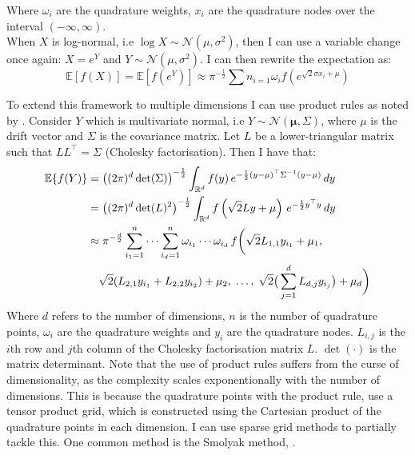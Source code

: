 \documentclass[11pt]{article}
\begin{document}
Where $\omega_i$ are the quadrature weights, $x_i$ are the quadrature nodes over the interval $(-\infty , \infty)$.\\
When $X$ is log-normal, i.e $\log X \sim \mathcal{N}(\mu , \sigma^{2})$, then I can use a variable change once again:
$X = e^{Y}$ and $Y \sim \mathcal{N}(\mu , \sigma^{2})$. I can then rewrite the expectation as:
\begin{equation}
  \mathbb{E} [ f(X) ] = \mathbb{E} [ f(e^{Y}) ] \approx \pi^{-\frac{1}{2}} \sum{n}_{i=1} \omega_i f \left( e^{ \sqrt{2} \sigma x_{i} + \mu } \right)
\end{equation}

To extend this framework to multiple dimensions I can use product rules as noted by \autocite{Judd1998Book}.
Consider $Y$ which is multivariate normal, i.e $Y \sim \mathcal{N}(\boldsymbol{\mu} , \Sigma)$,
where $\mu$ is the drift vector and $\Sigma$ is the covariance matrix.
Let $L$ be a lower-triangular matrix such that $LL^{\top} = \Sigma$ (Cholesky factorisation).
Then I have that:
\begin{align}
  \mathbb{E}\{f(Y)\} & = \left( (2\pi)^d \det(\Sigma) \right)^{-\frac{1}{2}} \int_{\mathbb{R}^d} f(y) \, e^{-\frac{1}{2}(y - \mu)^{\top} \Sigma^{-1} (y - \mu)} \, dy \\
  & = \left( (2\pi)^d \det(L)^2 \right)^{-\frac{1}{2}} \int_{\mathbb{R}^d} f\left(\sqrt{2} L y + \mu\right) \, e^{-\frac{1}{2} y^{\top} y} \, dy \\
  & \approx \pi^{-\frac{d}{2}} \sum_{i_1=1}^n \cdots \sum_{i_d=1}^n \omega_{i_1} \cdots \omega_{i_d} \, f
  \bigg(\sqrt{2} L_{1,1} y_{i_1} + \mu_1, \;
  \notag \\
  & \quad \sqrt{2} (L_{2,1} y_{i_1} + L_{2,2} y_{i_2}) + \mu_2, \;
  \ldots, \;
  \sqrt{2} \big(\sum_{j=1}^d L_{d,j} y_{i_j}\big) + \mu_d
  \bigg) 
  \end{align}
Where $d$ refers to the number of dimensions, $n$ is the number of quadrature points, $\omega_i$ are the quadrature weights and $y_i$ are the quadrature nodes.
$L_{i,j}$ is the $i$th row and $j$th column of the Cholesky factorisation matrix $L$. $\det (\cdot)$ is the matrix determinant.
Note that the use of product rules suffers from the curse of dimensionality, 
as the complexity scales exponentionally with the number of dimensions. This is because the quadrature points with the product rule,
use a tensor product grid, which is constructed using the Cartesian product of the quadrature points in each dimension.
I can use sparse grid methods to partially tackle this. One common method  is the Smolyak method, \autocite{smolyak1963}.
\end{document}

